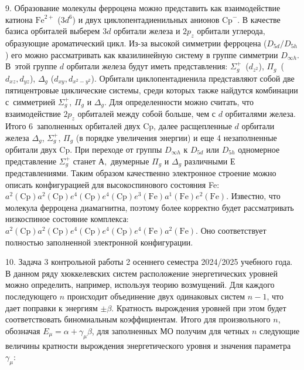 9. Образование молекулы ферроцена можно представить как взаимодействие катиона $\text{Fe}^{2+}$ ($3d^6$) и двух циклопентадиенильных анионов $\text{Cp}^-$. В качестве базиса орбиталей выберем $3d$ орбитали железа и $2p_z$ орбитали углерода, образующие ароматический цикл. Из-за высокой симметрии ферроцена ($D_{5d} / D_{5h}$) его можно рассматривать как квазилинейную систему в группе симметрии $D_{\infty h}$. В~этой группе $d$ орбитали железа будут иметь представления: $\Sigma_g^+$~($d_{z^2}$), $\Pi_g$~($d_{xz}, d_{yz}$), $\Delta_g$ ($d_{xy}, d_{x^2-y^2}$). Орбитали циклопентадиенила представляют собой две пятицентровые циклические системы, среди которых также найдутся комбинации с~симметрией $\Sigma_g^+$, $\Pi_g$ и $\Delta_g$. Для определенности можно считать, что взаимодействие $2p_z$ орбиталей между собой больше, чем с $d$ орбиталями железа. Итого 6~заполненных орбиталей двух Cp, далее расщепленные $d$ орбитали железа $\Delta_g$, $\Sigma_g^+$, $\Pi_g$ (в порядке увеличения энергии) и еще 4 незаполненные орбитали двух Cp. При переходе от группы $D_{\infty h}$ к $D_{5d}$ или $D_{5h}$ одномерное представление $\Sigma_g^+$  станет $А,$ двумерные $\Pi_g$ и $\Delta_g$ различными $Е$ представлениями. Таким образом качественно электронное строение можно описать конфигурацией для высокоспинового состояния Fe: $a^2(\text{Cp}) a^2(\text{Cp}) e^4(\text{Cp}) e^4(\text{Cp}) e^3(\text{Fe}) a^1(\text{Fe}) e^2(\text{Fe})$. Известно, что молекула ферроцена диамагнитна, поэтому более корректно будет рассматривать низкоспиное состояние комплекса: $a^2(\text{Cp}) a^2(\text{Cp}) e^4(\text{Cp}) e^4(\text{Cp}) e^4(\text{Fe}) a^2(\text{Fe})$. Оно соответствует полностью заполненной электронной конфигурации.\par
10. Задача 3 контрольной работы 2 осеннего семестра 2024/2025 учебного года. В данном ряду хюккелевских систем расположение энергетических уровней можно определить, например, используя теорию возмущений. Для каждого последующего $n$ происходит объединение двух одинаковых систем $n-1$, что дает поправки к энергиям $\pm \beta$. Кратность вырождения уровней при этом будет соответствовать биномиальным коэффициентам. Итого для произвольного $n$, обозначая $E_{\mu}=\alpha+\gamma_{\mu} \beta$, для заполненных МО получим для четных $n$ следующие величины кратности вырождения энергетического уровня и значения параметра $\gamma_{\mu}$:\par
\vspace{-\parskip}
\vspace{2mm}
\hspace{8mm}
